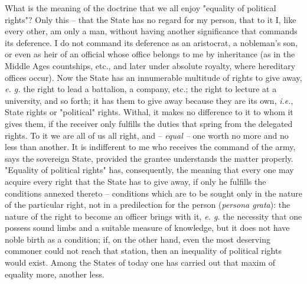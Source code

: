 What is the meaning of the doctrine that we all enjoy "{}equality of political 
rights"{}? Only this -- that the State has no regard for my person, that to it 
I, like every other, am only a man, without having another significance that 
commands its deference. I do not command its deference as an aristocrat, a 
nobleman's son, or even as heir of an official whose office belongs to me by 
inheritance (as in the Middle Ages countships, etc., and later under absolute 
royalty, where hereditary offices occur). Now the State has an innumerable 
multitude of rights to give away, \textit{e. g.} the right to lead a 
battalion, a company, etc.; the right to lecture at a university, and so 
forth; it has them to give away because they are its own, \textit{i.e.}, State 
rights or "{}political"{} rights. Withal, it makes no difference to it to whom 
it gives them, if the receiver only fulfills the duties that spring from the 
delegated rights. To it we are all of us all right, and -- \textit{equal --} 
one worth no more and no less than another. It is indifferent to me who 
receives the command of the army, says the sovereign State, provided the 
grantee understands the matter properly. "{}Equality of political rights"{} 
has, consequently, the meaning that every one may acquire every right that the 
State has to give away, if only he fulfills the conditions annexed thereto -- 
conditions which are to be sought only in the nature of the particular right, 
not in a predilection for the person (\textit{persona grata}): the nature of 
the right to become an officer brings with it, \textit{e. g.} the necessity 
that one possess sound limbs and a suitable measure of knowledge, but it does 
not have noble birth as a condition; if, on the other hand, even the most 
deserving commoner could not reach that station, then an inequality of 
political rights would exist. Among the States of today one has carried out 
that maxim of equality more, another less.

